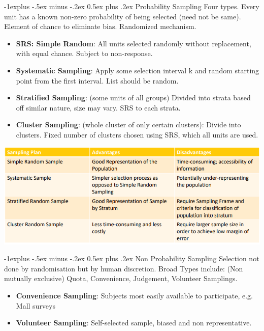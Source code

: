 \documentclass[10pt, landscape]{article}
\makeatletter
\renewcommand{\subsection}{\@startsection{subsection}{2}{0mm}%
                                {-1explus -.5ex minus -.2ex}%
                                {0.5ex plus .2ex}%
                                {\normalfont\normalsize\bfseries}}
\makeatother
\begin{document}
\begin{multicols*}{4}
\subsection{Probability Sampling}
	Four types. Every unit has a known non-zero probability of being selected (need not be same). Element of chance to eliminate bias. Randomized mechanism.
\begin{itemize}
	\item \textbf{SRS: Simple Random}: All units selected randomly without replacement, with equal chance. Subject to non-response.
	\item \textbf{Systematic Sampling}: Apply some selection interval k and random starting point from the first interval. List should be random.
	\item \textbf{Stratified Sampling}: (some units of all groups) Divided into strata based off similar nature, size may vary. SRS to each strata.
	\item \textbf{Cluster Sampling}: (whole cluster of only certain clusters): Divide into clusters. Fixed number of clusters chosen using SRS, which all units are used.
\end{itemize}
\includegraphics[width = \linewidth]{samplingPlans}

\subsection{Non Probability Sampling}
	Selection not done by randomisation but by human discretion. Broad Types include: (Non mutually exclusive) Quota, Convenience, Judgement, Volunteer Samplings.
\begin{itemize}
	\item \textbf{Convenience Sampling}: Subjects most easily available to participate, e.g. Mall surveys
	\item \textbf{Volunteer Sampling}: Self-selected sample, biased and non representative.
\end{itemize}


\end{multicols*}
\end{document}
